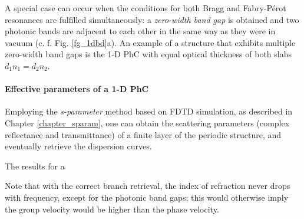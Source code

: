 A special case can occur when the conditions for both Bragg and Fabry-Pérot resonances are fulfilled simultaneously: a \textit{zero-width band gap} is obtained and two photonic bands are adjacent to each other in the same way as they were in vacuum (c. f. Fig. \ref{fg_1dbd}a). An example of a structure that exhibits multiple zero-width band gaps is the 1-D PhC with equal optical thickness of both slabs $d_1 n_1 = d_2 n_2$. 



\paragraph{Effective parameters of a 1-D PhC}
Employing the \textit{s-parameter} method based on FDTD simulation, as described in Chapter \ref{chapter_sparam}, one can obtain the scattering parameters (complex reflectance and transmittance) of a finite layer of the periodic structure, and eventually retrieve the dispersion curves. 

The results for a 

Note that with the correct branch retrieval, the index of refraction never drops with frequency, except for the photonic band gaps; this would otherwise imply the group velocity would be higher than the phase velocity.





